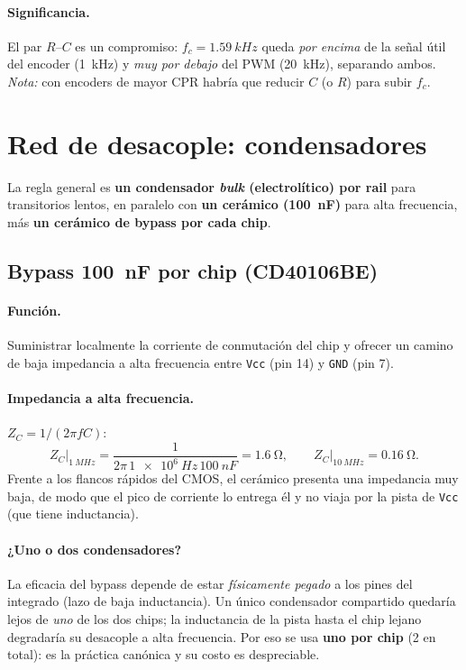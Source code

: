 \documentclass[11pt,letterpaper]{article}
\begin{document}
\paragraph{Significancia.} El par $R$--$C$ es un compromiso: $f_c=\SI{1.59}{kHz}$
queda \emph{por encima} de la señal útil del encoder (\SI{1}{kHz}) y \emph{muy por
debajo} del PWM (\SI{20}{kHz}), separando ambos. \emph{Nota:} con encoders de mayor
CPR habría que reducir $C$ (o $R$) para subir $f_c$.

\section{Red de desacople: condensadores}
La regla general es \textbf{un condensador \emph{bulk} (electrolítico) por rail}
para transitorios lentos, en paralelo con \textbf{un cerámico (\SI{100}{nF})} para
alta frecuencia, más \textbf{un cerámico de bypass por cada chip}.

\subsection{Bypass \texorpdfstring{\SI{100}{nF}}{100 nF} por chip (CD40106BE)}
\paragraph{Función.} Suministrar localmente la corriente de conmutación del chip y
ofrecer un camino de baja impedancia a alta frecuencia entre \texttt{Vcc} (pin 14)
y \texttt{GND} (pin 7).

\paragraph{Impedancia a alta frecuencia.} $Z_C = 1/(2\pi f C)$:
\begin{equation}
  Z_C\big|_{\SI{1}{MHz}} = \frac{1}{2\pi\,\SI{1e6}{Hz}\,\SI{100}{nF}}
  = \SI{1.6}{\ohm}, \qquad
  Z_C\big|_{\SI{10}{MHz}} = \SI{0.16}{\ohm}.
\end{equation}
Frente a los flancos rápidos del CMOS, el cerámico presenta una impedancia muy
baja, de modo que el pico de corriente lo entrega él y no viaja por la pista de
\texttt{Vcc} (que tiene inductancia).

\paragraph{¿Uno o dos condensadores?} La eficacia del bypass depende de estar
\emph{físicamente pegado} a los pines del integrado (lazo de baja inductancia). Un
único condensador compartido quedaría lejos de \emph{uno} de los dos chips; la
inductancia de la pista hasta el chip lejano degradaría su desacople a alta
frecuencia. Por eso se usa \textbf{uno por chip} (2 en total): es la práctica
canónica y su costo es despreciable.
\end{document}

